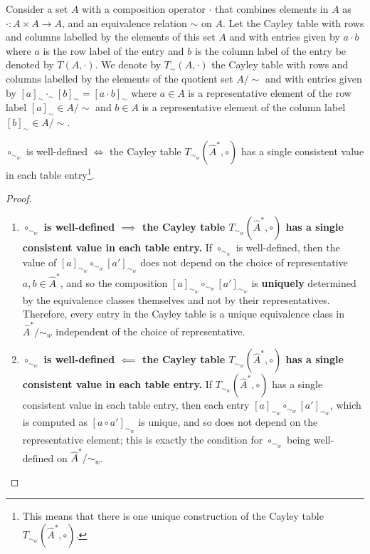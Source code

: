 Consider a set $A$ with a composition operator $\cdot$ that combines elements in $A$ as $\cdot: A \times A \to A$, and an equivalence relation $\sim$ on $A$.
Let the Cayley table with rows and columns labelled by the elements of this set $A$ and with entries given by $a \cdot b$ where $a$ is the row label of the entry and $b$ is the column label of the entry be denoted by $T(A, \cdot)$.
We denote by $T_{\sim}(A, \cdot)$ the Cayley table with rows and columns labelled by the elements of the quotient set $A/\sim$ and with entries given by $[a]_{\sim} \cdot_{\sim} [b]_{\sim} = [a \cdot b]_{\sim}$ where $a \in A$ is a representative element of the row label $[a]_{\sim} \in A/\sim$ and $b \in A$ is a representative element of the column label $[b]_{\sim} \in A/\sim$.


\begin{proposition}
    $\circ_{\sim_{w}}$ is well-defined $\iff$ the Cayley table $T_{\sim_{w}}(\hat{A}^{*}, \circ)$ has a single consistent value in each table entry\footnote{
    This means that there is one unique construction of the Cayley table $T_{\sim_{w}}(\hat{A}^{*}, \circ)$.
    }.
\end{proposition}
\begin{proof}
\begin{enumerate}[(1)]
    \item \textbf{$\circ_{\sim_{w}}$ is well-defined $\implies$ the Cayley table $T_{\sim_{w}}(\hat{A}^{*}, \circ)$ has a single consistent value in each table entry.}
    If $\circ_{\sim_{w}}$ is well-defined, then the value of $[a]_{\sim_{w}} \circ_{\sim_{w}} [a']_{\sim_{w}}$ does not depend on the choice of representative $a, b \in \hat{A}^{*}$, and so the composition $[a]_{\sim_{w}} \circ_{\sim_{w}} [a']_{\sim_{w}}$ is \textbf{uniquely} determined by the equivalence classes themselves and not by their representatives.
    Therefore, every entry in the Cayley table is a unique equivalence class in $\hat{A}^{*}/\sim_{w}$ independent of the choice of representative.

    \item \textbf{$\circ_{\sim_{w}}$ is well-defined $\impliedby$ the Cayley table $T_{\sim_{w}}(\hat{A}^{*}, \circ)$ has a single consistent value in each table entry.}
    If $T_{\sim_{w}}(\hat{A}^{*}, \circ)$ has a single consistent value in each table entry, then each entry $[a]_{\sim_{w}} \circ_{\sim_{w}} [a']_{\sim_{w}}$, which is computed as $[a \circ a']_{\sim_{w}}$ is unique, and so does not depend on the representative element; this is exactly the condition for $\circ_{\sim_{w}}$ being well-defined on $\hat{A}^{*}/\sim_{w}$.
\end{enumerate}
\end{proof}

